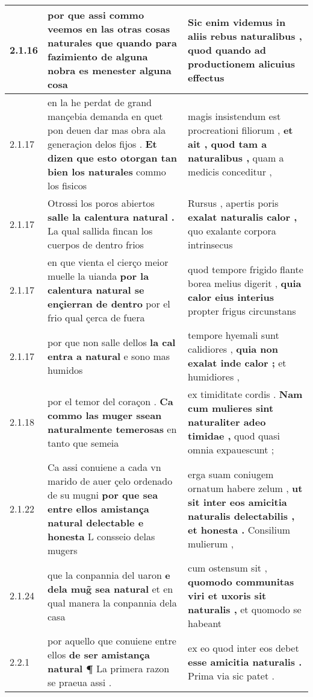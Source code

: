\begin{tabular}{|p{1cm}|p{6.5cm}|p{6.5cm}|}
2.1.16 & por que assi commo veemos \textbf{ en las otras cosas naturales } que quando para fazimiento de alguna nobra es menester alguna cosa & Sic enim videmus \textbf{ in aliis rebus naturalibus , } quod quando ad productionem alicuius effectus \\\hline
2.1.17 & en la he perdat de grand mançebia demanda en quet pon deuen dar mas obra ala generaçion delos fijos . \textbf{ Et dizen que esto otorgan tan bien los naturales } commo los fisicos & magis insistendum est procreationi filiorum , \textbf{ et ait , quod tam a naturalibus , } quam a medicis conceditur , \\\hline
2.1.17 & Otrossi los poros abiertos \textbf{ salle la calentura natural . } La qual sallida fincan los cuerpos de dentro frios & Rursus , apertis poris \textbf{ exalat naturalis calor , } quo exalante corpora intrinsecus \\\hline
2.1.17 & en que vienta el cierço meior muelle la uianda \textbf{ por la calentura natural se ençierran de dentro } por el frio qual çerca de fuera & quod tempore frigido flante borea melius digerit , \textbf{ quia calor eius interius } propter frigus circunstans \\\hline
2.1.17 & por que non salle dellos \textbf{ la cal entra a natural } e sono mas humidos & tempore hyemali sunt calidiores , \textbf{ quia non exalat inde calor ; } et humidiores , \\\hline
2.1.18 & por el temor del coraçon . \textbf{ Ca commo las muger ssean naturalmente temerosas } en tanto que semeia & ex timiditate cordis . \textbf{ Nam cum mulieres sint naturaliter adeo timidae , } quod quasi omnia expauescunt ; \\\hline
2.1.22 & Ca assi conuiene a cada vn marido de auer çelo ordenado de su mugni \textbf{ por que sea entre ellos amistança natural delectable e honesta } L consseio delas mugers & erga suam coniugem ornatum habere zelum , \textbf{ ut sit inter eos amicitia naturalis delectabilis , et honesta . } Consilium mulierum , \\\hline
2.1.24 & que la conpannia del uaron \textbf{ e dela mug̃ sea natural } et en qual manera la conpannia dela casa & cum ostensum sit , \textbf{ quomodo communitas viri et uxoris sit naturalis , } et quomodo se habeant \\\hline
2.2.1 & por aquello que conuiene entre ellos \textbf{ de ser amistança natural ¶ } La primera razon se praeua assi . & ex eo quod inter eos debet \textbf{ esse amicitia naturalis . } Prima via sic patet . \\\hline

\end{tabular}
